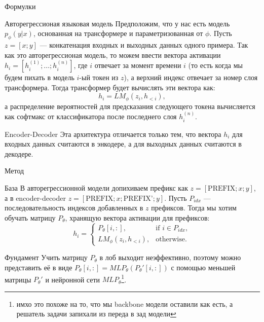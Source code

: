 \documentclass[9pt]{beamer}
\begin{document}
\begin{frame}{Формулки}

    \begin{block}{Авторегрессионая языковая модель}
        Предположим, что у нас есть модель $p_{\phi}(y | x)$, основанная на трансформере и параметризованная от $\phi$. Пусть $z = [x; y]$ --- конкатенация входных и выходных данных одного примера. Так как это авторегрессионая модель, то можем ввести вектора активации $h_i = [h_i^{(1)}; \ldots ; h_i^{(n)}]$, где $i$ отвечает за момент времени $i$ (то есть когда мы будем пихать в модель $i$-ый токен из $z$), а верхний индекс отвечает за номер слоя трансформера. Тогда трансформер будет вычислять эти вектора как: \[ h_i = LM_{\phi}(z_i, h_{<i}), \] а распределение вероятностей для предсказания следующего токена вычисляется как софтмакс от классификатора после последнего слоя $h_i^{(n)}$.
    \end{block}

    \begin{block}{Encoder-Decoder}
        Эта архитектура отличается только тем, что вектора $h_i$ для входных данных считаются в энкодере, а для выходных данных считаются в декодере.
    \end{block}

\end{frame}


\begin{frame}{Метод}
    
    \begin{block}{База}
        В авторегрессионной модели допихиваем префикс как $z = [\text{PREFIX}; x; y]$, а в encoder-decoder $z = [\text{PREFIX}; x; \text{PREFIX'}; y]$. Пусть $P_{idx}$ --- последовательность индексов добавленных в $z$ префиксов. Тогда мы хотим обучать матрицу $P_{\theta}$, хранящую вектора активации для префиксов: \[ h_i = \begin{cases}
            P_{\theta}[i, :], & \text{if } i \in P_{idx}, \\
            LM_{\phi}(z_i, h_{<i}), & \text{otherwise}.
        \end{cases} \]
    \end{block}

    \begin{block}{Фундамент}
        Учить матрицу $P_{\theta}$ в лоб выходит неэффективно, поэтому можно представить её в виде $P_{\theta}[i, :] = MLP_{\theta}(P_{\theta}'[i, :])$ с помощью меньшей матрицы $P_{\theta}'$ и нейронной сети $MLP_{\theta}$\footnote{имхо это похоже на то, что мы backbone модели оставили как есть, а решатель задачи запихали из переда в зад модели}.
    \end{block}

\end{frame}
\end{document}
